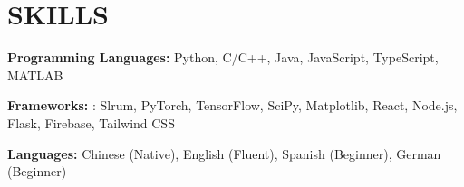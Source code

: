     \section{SKILLS}
    \begin{onecolentry}
        {\ResumeSkillFont\textbf{Programming Languages:} Python, C/C++, Java, JavaScript, TypeScript, MATLAB}
    \end{onecolentry}

    \begin{onecolentry}
        {\ResumeSkillFont\textbf{Frameworks:} : Slrum, PyTorch, TensorFlow, SciPy, Matplotlib, React, Node.js, Flask, Firebase, Tailwind CSS}
    \end{onecolentry}

    \begin{onecolentry}
        {\ResumeSkillFont\textbf{Languages:} Chinese (Native), English (Fluent), Spanish (Beginner), German (Beginner)}
    \end{onecolentry}
